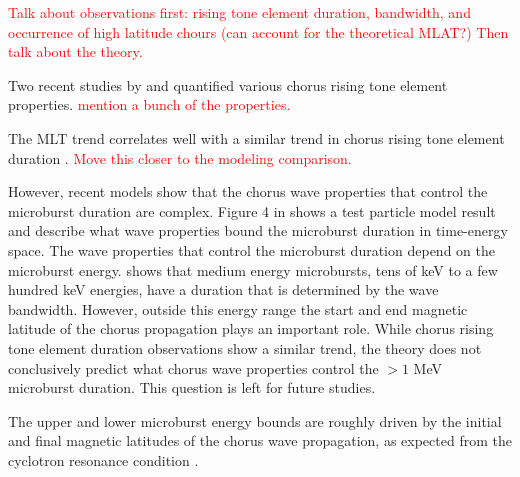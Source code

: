 \documentclass[draft]{agujournal2019}
\begin{document}
\textcolor{red}{Talk about observations first: rising tone element duration, bandwidth, and occurrence of high latitude chours (can account for the theoretical MLAT?) Then talk about the theory.}

Two recent studies by  and  quantified various chorus rising tone element properties. \textcolor{red}{mention a bunch of the properties.}

The MLT trend correlates well with a similar trend in chorus rising tone element duration \cite{Teng2017, Shue2019}. \textcolor{red}{Move this closer to the modeling comparison.}

However, recent models show that the chorus wave properties that control the microburst duration are complex. Figure 4 in  shows a test particle model result and describe what wave properties bound the microburst duration in time-energy space. The wave properties that control the microburst duration depend on the microburst energy.  shows that medium energy microbursts, tens of keV to a few hundred keV energies, have a duration that is determined by the wave bandwidth. However, outside this energy range the start and end magnetic latitude of the chorus propagation plays an important role. While chorus rising tone element duration observations show a similar trend, the theory does not conclusively predict what chorus wave properties control the $> 1$ MeV microburst duration. This question is left for future studies.

The upper and lower microburst energy bounds are roughly driven by the initial and final magnetic latitudes of the chorus wave propagation, as expected from the cyclotron resonance condition \cite{Lorentzen2001a}. 
\end{document}
